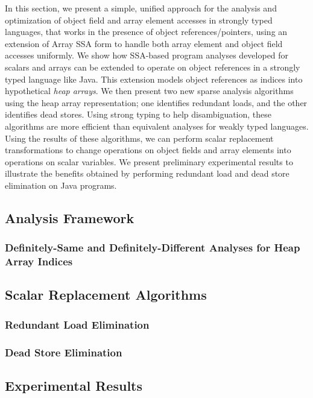 In this section, we present a simple, unified approach for the analysis and
optimization of 
object field and array element accesses in strongly typed languages, 
that works in the presence of
object references/pointers, using an extension of Array SSA form to handle both array element and object field accesses 
uniformly.
We show how SSA-based program
analyses developed for scalars and arrays can be extended to
operate on object references in a strongly typed language like Java.
This extension models object references as
indices into hypothetical {\em heap arrays}.
We then present two new sparse analysis
algorithms using
the heap array representation; one identifies redundant loads, and the
other identifies dead stores.
Using strong typing to help disambiguation, these algorithms are
more efficient than equivalent analyses for weakly typed languages.
Using the results of these algorithms, we can perform scalar replacement
transformations to change operations on object fields
and array elements into operations on scalar
variables.  We present preliminary experimental results to illustrate the benefits obtained by
performing redundant load and dead store elimination on Java
programs.  


\subsection{Analysis Framework}\label{model}


\subsubsection{ Definitely-Same and Definitely-Different Analyses for Heap Array Indices}\label{svalnum}


\subsection{Scalar Replacement Algorithms}
\label{scalrep}


\subsubsection{Redundant Load Elimination}
\label{alg}


\subsubsection{Dead Store Elimination}\label{store}


\subsection{Experimental Results}\label{results}
   